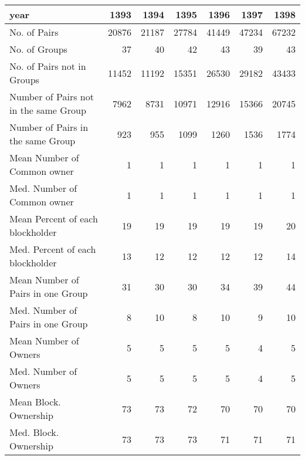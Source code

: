 \begin{tabular}{lrrrrrr}
\toprule
year &   1393 &   1394 &   1395 &   1396 &   1397 &   1398 \\
\midrule
No. of Pairs                          &  20876 &  21187 &  27784 &  41449 &  47234 &  67232 \\
No. of Groups                         &     37 &     40 &     42 &     43 &     39 &     43 \\
No. of Pairs not in Groups            &  11452 &  11192 &  15351 &  26530 &  29182 &  43433 \\
Number of Pairs not in the same Group &   7962 &   8731 &  10971 &  12916 &  15366 &  20745 \\
Number of Pairs in the same Group     &    923 &    955 &   1099 &   1260 &   1536 &   1774 \\
Mean Number of Common owner           &      1 &      1 &      1 &      1 &      1 &      1 \\
Med. Number of Common owner           &      1 &      1 &      1 &      1 &      1 &      1 \\
Mean Percent of each blockholder      &     19 &     19 &     19 &     19 &     19 &     20 \\
Med. Percent of each blockholder      &     13 &     12 &     12 &     12 &     12 &     14 \\
Mean Number of Pairs in one Group     &     31 &     30 &     30 &     34 &     39 &     44 \\
Med. Number of Pairs in one Group     &      8 &     10 &      8 &     10 &      9 &     10 \\
Mean Number of Owners                 &      5 &      5 &      5 &      5 &      4 &      5 \\
Med. Number of Owners                 &      5 &      5 &      5 &      5 &      4 &      5 \\
Mean Block. Ownership                 &     73 &     73 &     72 &     70 &     70 &     70 \\
Med. Block. Ownership                 &     73 &     73 &     73 &     71 &     71 &     71 \\
\bottomrule
\end{tabular}
